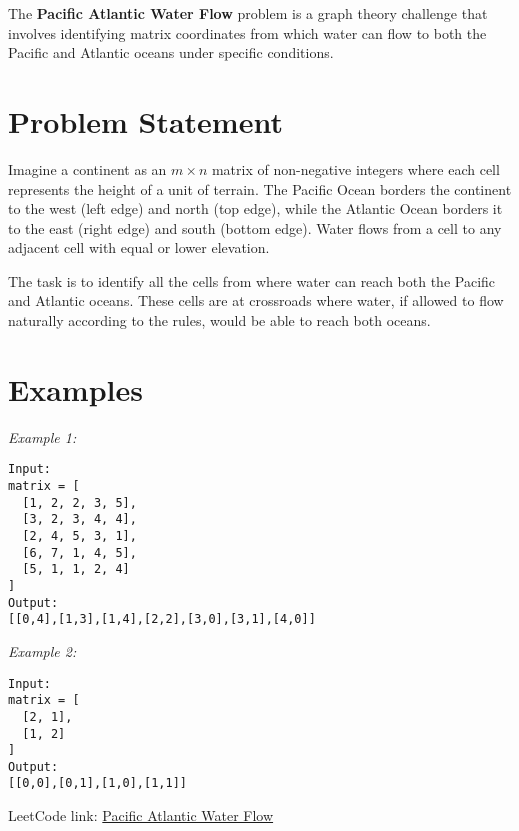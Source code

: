 
\label{problem:pacific_atlantic_water_flow}
    
The \textbf{Pacific Atlantic Water Flow} problem is a graph theory challenge that involves identifying matrix coordinates from which water can flow to both the Pacific and Atlantic oceans under specific conditions.

\section*{Problem Statement}
Imagine a continent as an \(m \times n\) matrix of non-negative integers where each cell represents the height of a unit of terrain. The Pacific Ocean borders the continent to the west (left edge) and north (top edge), while the Atlantic Ocean borders it to the east (right edge) and south (bottom edge). Water flows from a cell to any adjacent cell with equal or lower elevation.

The task is to identify all the cells from where water can reach both the Pacific and Atlantic oceans. These cells are at crossroads where water, if allowed to flow naturally according to the rules, would be able to reach both oceans.

\section*{Examples}

\textit{Example 1:}

\begin{verbatim}
Input:
matrix = [
  [1, 2, 2, 3, 5],
  [3, 2, 3, 4, 4],
  [2, 4, 5, 3, 1],
  [6, 7, 1, 4, 5],
  [5, 1, 1, 2, 4]
]
Output:
[[0,4],[1,3],[1,4],[2,2],[3,0],[3,1],[4,0]]
\end{verbatim}

\textit{Example 2:}

\begin{verbatim}
Input:
matrix = [
  [2, 1],
  [1, 2]
]
Output:
[[0,0],[0,1],[1,0],[1,1]]
\end{verbatim}

LeetCode link: \href{https://leetcode.com/problems/pacific-atlantic-water-flow/}{Pacific Atlantic Water Flow}

